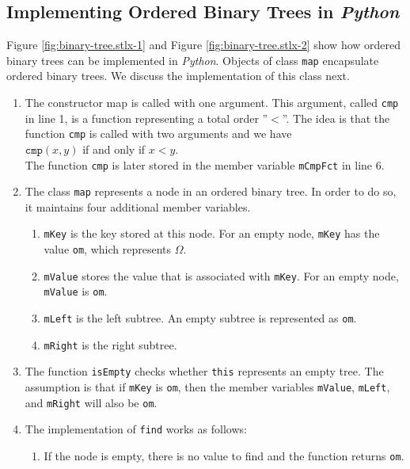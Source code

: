 \subsection{Implementing Ordered Binary Trees in \textsl{Python}}
Figure \ref{fig:binary-tree.stlx-1} and Figure \ref{fig:binary-tree.stlx-2} show how ordered binary
trees can be implemented in \textsl{Python}.  Objects of class \texttt{map} encapsulate ordered
binary trees.  We discuss the implementation of this class next.
\begin{enumerate}
\item The constructor map is called with one argument.  This argument, called \texttt{cmp}
      in line 1, is a function representing a total order ''$<$''.  The idea is that the function
      \texttt{cmp} is called with two arguments and we have
      \\[0.2cm]
      \hspace*{1.3cm}
      $\mathtt{cmp}(x,y)$ \quad if and only if \quad $x < y$.
      \\[0.2cm]
      The function \texttt{cmp} is later stored in the member variable \texttt{mCmpFct} in line 6.
\item The class \texttt{map} represents a node in an ordered binary tree.  In order to do so, it
      maintains four additional member variables.
      \begin{enumerate}
      \item \texttt{mKey} is the key stored at this node.  For an empty node, \texttt{mKey}
            has the value \texttt{om}, which represents $\Omega$.
      \item \texttt{mValue} stores the value that is associated with \texttt{mKey}.  For an empty node,
            \texttt{mValue} is \texttt{om}.
      \item \texttt{mLeft} is the left subtree.  An empty subtree is represented as \texttt{om}.
      \item \texttt{mRight} is the right subtree.  
      \end{enumerate}
\item The function \texttt{isEmpty} checks whether \texttt{this} represents an empty tree.
      The assumption is that if \texttt{mKey} is \texttt{om}, then the member variables
      \texttt{mValue}, \texttt{mLeft}, and \texttt{mRight} will also be \texttt{om}.
\item The implementation of \texttt{find} works as follows:
      \begin{enumerate}
      \item If the node is empty, there is no value to find and the function returns \texttt{om}.

\end{enumerate}
\end{enumerate}
